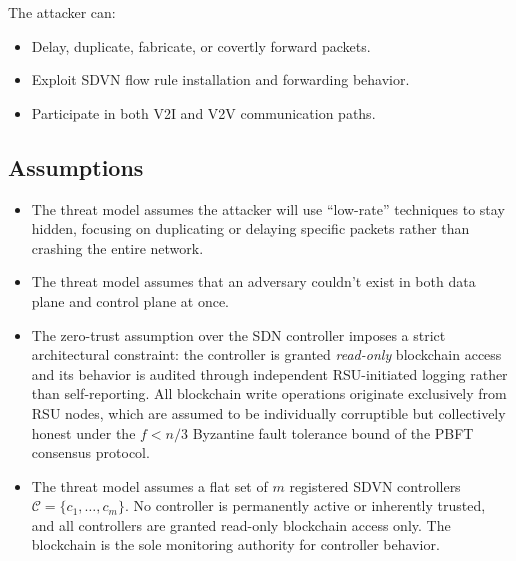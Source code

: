 \documentclass[12pt, a4paper]{report}
\begin{document}
The attacker can:
\begin{itemize}
  \item Delay, duplicate, fabricate, or covertly forward packets.
  \item Exploit SDVN flow rule installation and forwarding behavior.
  \item Participate in both V2I and V2V communication paths\cite{app10093217}.
\end{itemize}

\subsection{Assumptions}

\begin{itemize}
  \item The threat model assumes the attacker will use ``low-rate'' techniques to stay hidden, focusing on duplicating or delaying specific packets rather than crashing the entire network.
  \item The threat model assumes that an adversary couldn't exist in both data plane and control plane at once.
  \item The zero-trust assumption over the SDN controller imposes a strict
architectural constraint: the controller is granted \emph{read-only}
blockchain access and its behavior is audited through independent
RSU-initiated logging rather than self-reporting. All blockchain
write operations originate exclusively from RSU nodes, which are
assumed to be individually corruptible but collectively honest under
the $f < n/3$ Byzantine fault tolerance bound of the PBFT consensus
protocol.

  \item The threat model assumes a flat set of $m$ registered \ac{SDVN}
  controllers $\mathcal{C}=\{c_1,\ldots,c_m\}$. No controller is
  permanently active or inherently trusted, and all controllers are
  granted read-only blockchain access only. The blockchain is the sole
  monitoring authority for controller behavior.


  
\end{itemize}
\end{document}
